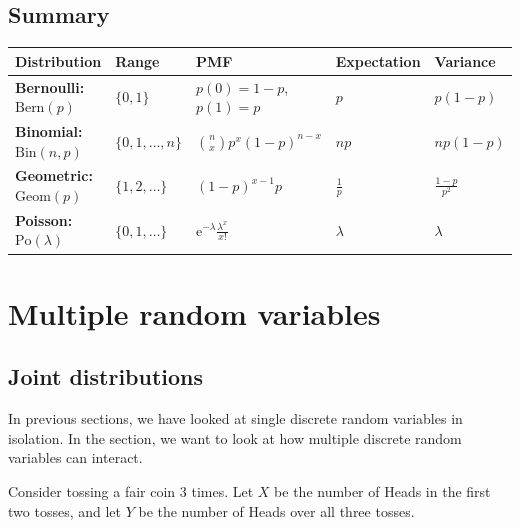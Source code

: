 \documentclass[
  a4paper,
]{book}
\theoremstyle{definition}
\theoremstyle{definition}
\theoremstyle{definition}
\theoremstyle{definition}
\theoremstyle{remark}
\begin{document}
\hypertarget{summary-06}{%
\section*{Summary}\label{summary-06}}

\begin{longtable}[]{@{}
  >{\raggedright\arraybackslash}p{}
  >{\centering\arraybackslash}p{}
  >{\centering\arraybackslash}p{}
  >{\centering\arraybackslash}p{}
  >{\centering\arraybackslash}p{}@{}}
\toprule
Distribution & Range & PMF & Expectation & Variance \\
\midrule
\endhead
\textbf{Bernoulli:} \(\text{Bern}(p)\) & \(\{0,1\}\) & \(p(0) = 1- p\), \(p(1) = p\) & \(p\) & \(p(1-p)\) \\
\textbf{Binomial:} \(\text{Bin}(n,p)\) & \(\{0,1,\dots,n\}\) & \(\displaystyle\binom{n}{x} p^x (1-p)^{n-x}\) & \(np\) & \(np(1-p)\) \\
\textbf{Geometric:} \(\text{Geom}(p)\) & \(\{1,2,\dots\}\) & \((1-p)^{x-1}p\) & \(\displaystyle\frac{1}{p}\) & \(\displaystyle\frac{1-p}{p^2}\) \\
\textbf{Poisson:} \(\text{Po}(\lambda)\) & \(\{0,1,\dots\}\) & \(\mathrm{e}^{-\lambda} \displaystyle\frac{\lambda^x}{x!}\) & \(\lambda\) & \(\lambda\) \\
\bottomrule
\end{longtable}

\hypertarget{S07-multi-rv}{%
\chapter{Multiple random variables}\label{S07-multi-rv}}

\hypertarget{joint}{%
\section{Joint distributions}\label{joint}}

In previous sections, we have looked at single discrete random variables in isolation. In the section, we want to look at how multiple discrete random variables can interact.

Consider tossing a fair coin 3 times. Let \(X\) be the number of Heads in the first two tosses, and let \(Y\) be the number of Heads over all three tosses.
\end{document}
